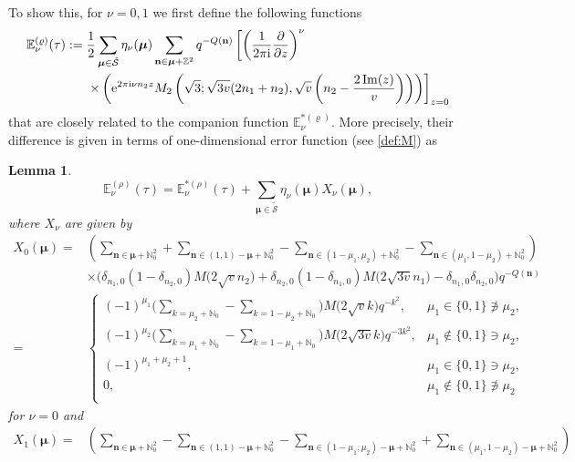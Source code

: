 \documentclass[10pt,a4paper]{amsart}
\def\BN{\mathbb{N}}
\def\BZ{\mathbb{Z}}
\def\BE{\mathbb{E}}
\def\CS{\mathcal{S}}
\def\ss{ \tilde{\mathcal{S}} }
\def\bon{\mathbf{n}}
\def\bos{\varrho}
\def\bmu{\boldsymbol{\mu}}
\def\bon{\boldsymbol{n}}
\def\im{\operatorname{Im}}
\newtheorem{lem}[thm]{Lemma}
\theoremstyle{definition}
\numberwithin{equation}{section}
\begin{document}
To show this, for $\nu =0, 1$ we first define the following functions
\begin{align}
\BE_\nu^{(\bos)}(\tau) :={}& \frac{1}{2} \sum_{\boldsymbol{\mu} \in \ss} \eta_\nu(\boldsymbol{\mu}) \sum_{\mathbf{n} \in \boldsymbol{\mu} + \BZ^2} q^{-Q(\mathbf{n})} \left[ \left({\frac{1}{2\pi {\rm i}}} {\frac{\partial}{\partial z}}\right)^\nu \right.\nonumber\\&
\left. \times\left({\rm e}^{2\pi {\rm i} \nu n_2 z} M_2 \left( \sqrt{3} ; \sqrt{3v} (2n_1 + n_2), \sqrt{v} \left(n_2 - {\frac{2\im(z)}{v}}\right)\right) \right) \right]_{z=0} \label{def:E01starless}
\end{align}
that are closely related to the companion function $\BE_\nu^{*(\bos)}$. More precisely, their difference is given in terms of one-dimensional error function (see \eqref{def:M}) as
\begin{lem}\label{lem:Estar_vs_starless}
 \[
\mathbb{E}^{(\rho)}_{\nu}(\tau)=\mathbb{E}^{*(\rho)}_{\nu}(\tau)+\sum_{\bmu\in\tilde{\CS}}\eta_{\nu}(\bmu)X_\nu(\bmu),
\]
where $X_\nu$ are given by
\begin{align*}
 X_{0}( \bmu )={}& \left( \sum_{\bon\in\bmu+\BN_{0}^{2}}+\sum_{\bon\in( 1,1 )-\bmu+\BN_{0}^{2}}-\sum_{\bon\in(1-\mu_{1},\mu_{2})+\BN_{0}^{2}}-\sum_{\bon\in(\mu_{1},1-\mu_{2})+\BN_{0}^{2}} \right)\\
 &\times\bigl( \delta_{n_{1},0}( 1-\delta_{n_{2},0} )M\bigl( 2\sqrt{v}n_{2} \bigr)+\delta_{n_{2},0}( 1-\delta_{n_{1},0} )M\bigl( 2\sqrt{3v}n_{1} \bigr)-\delta_{n_{1},0}\delta_{n_{2},0} \bigr)q^{-Q( \bon)}\\
 ={}& \begin{cases}
 ( -1 )^{\mu_{1}}\bigl( \sum_{k=\mu_{2}+\BN_{0}}-\sum_{k=1-\mu_{2}+\BN_{0}} \bigr)M\bigl( 2\sqrt{v}k \bigr)q^{-k^{2}},& \mu_{1}\in\{ 0,1 \}\not \ni \mu_{2},\\
 ( -1 )^{\mu_{2}}\bigl( \sum_{k=\mu_{1}+\BN_{0}}-\sum_{k=1-\mu_{1}+\BN_{0}} \bigr)M\bigl( 2\sqrt{3v}k \bigr)q^{-3k^{2}},& \mu_{1}\not\in\{ 0,1 \}\ni\mu_{2},\\
 ( -1 )^{\mu_{1}+\mu_{2}+1},& \mu_{1}\in\{ 0,1 \}\ni\mu_{2},\\
 0,& \mu_{1}\not\in\{ 0,1 \}\not \ni \mu_{2}\\
 \end{cases}
\end{align*}
for $\nu = 0$ and
\begin{align*}
 X_{1}( \bmu )={}& \left( \sum_{\bon\in\bmu+\BN_{0}^{2}}-\sum_{\bon\in\left( 1,1 \right)-\bmu+\BN_{0}^{2}}-\sum_{\bon\in( 1-\mu_{1},\mu_{2} )-\bmu+\BN_{0}^{2}}+\sum_{\bon\in(\mu_{1},1-\mu_{2} )-\bmu+\BN_{0}^{2}} \right)\\

\end{align*}
\end{lem}
\end{document}

